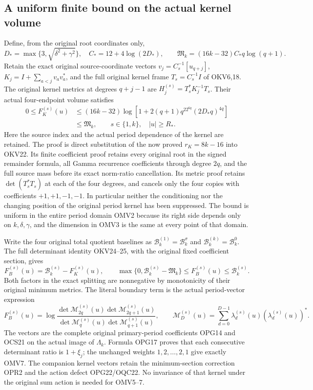 \documentclass[11pt,a4paper]{article}
\begin{document}
\subsection{A uniform finite bound on the actual kernel volume}
Define, from the original root coordinates only,
\[
 D_*=\max\{3,\sqrt{\delta^2+\gamma^2}\},\quad
 C_*=12+4\log(2D_*),\qquad
 \mathfrak M_k=(16k-32)C_*q\log(q+1).
 \tag{OMV4}
\]
Retain the exact original source-coordinate vectors
$v_j=C_s^{-1}[u_{q+j}]$, $K_j=I+\sum_{a<j}v_av_a^*$,
and the full original kernel frame $T_s=C_s^{-1}I$ of OKV6,18.
The original kernel metrics at degrees $q+j-1$ are
$H_j^{(s)}=T_s^*K_j^{-1}T_s$. Their actual four-endpoint volume
satisfies
\[
 \boxed{\begin{split}
 0\leq F_K^{(s)}(u)
 &\leq(16k-32)\log\!\left[
       1+2(q+1)q^22^{6q}(2D_*q)^{4q}\right]\\
 &\leq\mathfrak M_k,
 \qquad s\in\{1,k\},\quad |u|\geq R_*.
 \end{split}}\tag{OMV5}
\]
Here the source index and the actual period dependence of the kernel
are retained. The proof is direct substitution of the now proved
$r_K=8k-16$ into OKV22. Its finite coefficient proof retains
every original root in the signed remainder formula, all Gamma
recurrence coefficients through degree $2q$, and the full source
mass before its exact norm-ratio cancellation. Its metric proof
retains $\det(T_s^*T_s)$ at each of the four degrees, and cancels
only the four copies with coefficients $+1,+1,-1,-1$.
In particular neither the conditioning nor the changing position
of the original period kernel has been suppressed. The bound is
uniform in the entire period domain OMV2 because its right side
depends only on $k,\delta,\gamma$, and the dimension in OMV3 is
the same at every point of that domain.

Write the four original total quotient baselines as
$\mathcal B_k^{(1)}=\mathcal B_k^\sigma$ and
$\mathcal B_k^{(k)}=\mathcal B_k^0$. The full determinant identity
OKV24--25, with the original fixed coefficient section, gives
\[
 F_B^{(s)}(u)=\mathcal B_k^{(s)}-F_K^{(s)}(u),\qquad
 \max\{0,\mathcal B_k^{(s)}-\mathfrak M_k\}
           \leq F_B^{(s)}(u)\leq\mathcal B_k^{(s)}.
 \tag{OMV6}
\]
Both factors in the exact splitting are nonnegative by monotonicity
of their original minimum metrics. The literal boundary term is
the actual period-vector expression
\[
 F_B^{(s)}(u)=\log\frac{
       \det\mathcal M_{2q}^{(s)}(u)\det\mathcal M_{2q+1}^{(s)}(u)}{
       \det\mathcal M_q^{(s)}(u)\det\mathcal M_{q+1}^{(s)}(u)},
 \qquad
 \mathcal M_D^{(s)}(u)=\sum_{d=0}^{D-1}
       \lambda_d^{(s)}(u)(\lambda_d^{(s)}(u))^*.
 \tag{OMV7}
\]
The vectors are the complete original primary-period coefficients
OPG14 and OCS21 on the actual image of $\Lambda_k$. Formula OPG17
proves that each consecutive determinant ratio is $1+\xi_j$;
the unchanged weights $1,2,\ldots,2,1$ give exactly OMV7.
The companion kernel vectors retain the minimum-section correction
OPR2 and the action defect OPG22/OQC22. No invariance of that kernel
under the original sum action is needed for OMV5--7.
\end{document}
